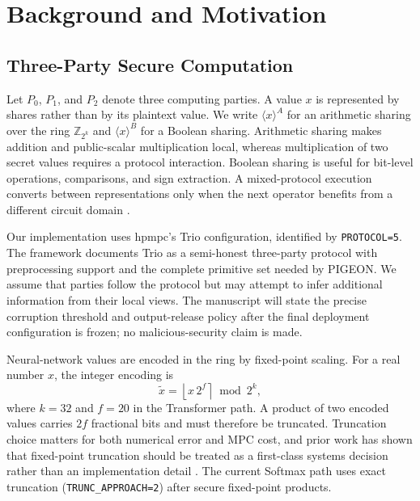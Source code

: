 \section{Background and Motivation}
\label{sec:background}

\subsection{Three-Party Secure Computation}
Let $P_0$, $P_1$, and $P_2$ denote three computing parties. A value $x$ is represented by shares rather than by its plaintext value. We write $\langle x\rangle^{A}$ for an arithmetic sharing over the ring $\mathbb{Z}_{2^k}$ and $\langle x\rangle^{B}$ for a Boolean sharing. Arithmetic sharing makes addition and public-scalar multiplication local, whereas multiplication of two secret values requires a protocol interaction. Boolean sharing is useful for bit-level operations, comparisons, and sign extraction. A mixed-protocol execution converts between representations only when the next operator benefits from a different circuit domain \cite{mohassel2018aby3}.

Our implementation uses hpmpc's Trio configuration, identified by \texttt{PROTOCOL=5}. The framework documents Trio as a semi-honest three-party protocol with preprocessing support and the complete primitive set needed by PIGEON. We assume that parties follow the protocol but may attempt to infer additional information from their local views. The manuscript will state the precise corruption threshold and output-release policy after the final deployment configuration is frozen; no malicious-security claim is made.

Neural-network values are encoded in the ring by fixed-point scaling. For a real number $x$, the integer encoding is
\begin{equation}
    \widetilde{x}=\left\lfloor x\,2^f\right\rceil \bmod 2^k,
    \label{eq:fixed-point}
\end{equation}
where $k=32$ and $f=20$ in the Transformer path. A product of two encoded values carries $2f$ fractional bits and must therefore be truncated. Truncation choice matters for both numerical error and MPC cost, and prior work has shown that fixed-point truncation should be treated as a first-class systems decision rather than an implementation detail \cite{harth2025truncation}. The current Softmax path uses exact truncation (\texttt{TRUNC\_APPROACH=2}) after secure fixed-point products.


